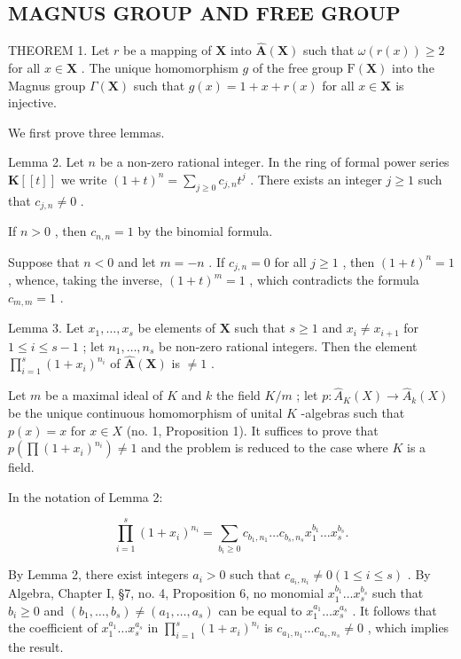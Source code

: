 \subsection{MAGNUS GROUP AND FREE GROUP}

THEOREM 1. Let \(r\) be a mapping of \(\mathbf{X}\) into \(\hat{\mathbf{A}}(\mathbf{X})\) such that \(\omega(r(x)) \geqslant 2\) for all \(x \in \mathbf{X}\) . The unique homomorphism \(g\) of the free group \(\mathrm{F}(\mathbf{X})\) into the Magnus group \(\Gamma(\mathbf{X})\) such that \(g(x) = 1 + x + r(x)\) for all \(x \in \mathbf{X}\) is injective.

We first prove three lemmas.

Lemma 2. Let \(n\) be a non-zero rational integer. In the ring of formal power series \(\mathbf{K}[[t]]\) we write \((1 + t)^n = \sum_{j \geqslant 0} c_{j,n} t^j\) . There exists an integer \(j \geqslant 1\) such that \(c_{j,n} \neq 0\) .

If \(n > 0\) , then \(c_{n,n} = 1\) by the binomial formula.

Suppose that \(n < 0\) and let \(m = -n\) . If \(c_{j,n} = 0\) for all \(j \geqslant 1\) , then \((1 + t)^n = 1\) , whence, taking the inverse, \((1 + t)^m = 1\) , which contradicts the formula \(c_{m,m} = 1\) .

Lemma 3. Let \(x_1, \ldots, x_s\) be elements of \(\mathbf{X}\) such that \(s \geqslant 1\) and \(x_i \neq x_{i+1}\) for \(1 \leqslant i \leqslant s-1\) ; let \(n_1, \ldots, n_s\) be non-zero rational integers. Then the element \(\prod_{i=1}^{s} (1 + x_i)^{n_i}\) of \(\hat{\mathbf{A}}(\mathbf{X})\) is \(\neq 1\) .

Let \(m\) be a maximal ideal of \(K\) and \(k\) the field \(K/m\) ; let \(p: \hat{A}_K(X) \to \hat{A}_k(X)\) be the unique continuous homomorphism of unital \(K\) -algebras such that \(p(x) = x\) for \(x \in X\) (no. 1, Proposition 1). It suffices to prove that \(p\left(\prod (1 + x_i)^{n_i}\right) \neq 1\) and the problem is reduced to the case where \(K\) is a field.

In the notation of Lemma 2:

\[
\prod_ {i = 1} ^ {s} (1 + x _ {i}) ^ {n _ {i}} = \sum_ {b _ {i} \geqslant 0} c _ {b _ {1}, n _ {1}} \dots c _ {b _ {s}, n _ {s}} x _ {1} ^ {b _ {1}} \dots x _ {s} ^ {b _ {s}}.
\]

By Lemma 2, there exist integers \(a_i > 0\) such that \(c_{a_i, n_i} \neq 0 (1 \leqslant i \leqslant s)\) . By Algebra, Chapter I, §7, no. 4, Proposition 6, no monomial \(x_1^{b_1} \ldots x_s^{b_s}\) such that \(b_{i} \geqslant 0\) and \((b_{1}, \ldots, b_{s}) \neq (a_{1}, \ldots, a_{s})\) can be equal to \(x_{1}^{a_{1}} \ldots x_{s}^{a_{s}}\) . It follows that the coefficient of \(x_{1}^{a_{1}} \ldots x_{s}^{a_{s}}\) in \(\prod_{i=1}^{s} (1 + x_{i})^{n_{i}}\) is \(c_{a_{1}, n_{1}} \ldots c_{a_{s}, n_{s}} \neq 0\) , which implies the result.

